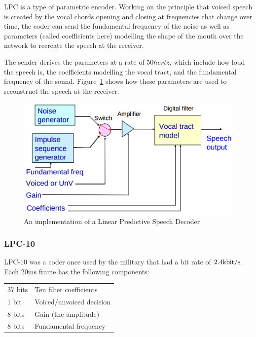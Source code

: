 LPC is a type of parametric encoder. Working on the principle that voiced speech
is created by the vocal chords opening and closing at frequencies that change
over time, the coder can send the fundamental frequency of the noise as well as
parameters (called coefficients here) modelling the shape of the mouth over the
network to recreate the speech at the receiver.

The sender derives the parameters at a rate of $50\si{hertz}$, which include how
loud the speech is, the coefficients modelling the vocal tract, and the
fundamental frequency of the sound. Figure~\ref{LPC} shows how these parameters
are used to reconstruct the speech at the receiver.

\begin{figure}
  \centering
  \includegraphics[width=\textwidth]{images/LPC}
  \caption{An implementation of a Linear Predictive Speech Decoder}
  \label{LPC}
\end{figure}

\subsubsection{LPC-10}

LPC-10 was a coder once used by the military that had a bit rate of
$2.4\si{\kilo\bit\per\second}$. Each $20\si{\milli\second}$ frame has the
following components:

\begin{tabular}{l l}
  37 bits & Ten filter coefficients\\
  1 bit & Voiced/unvoiced decision\\
  8 bits & Gain (the amplitude)\\
  8 bits & Fundamental frequency\\
\end{tabular}

